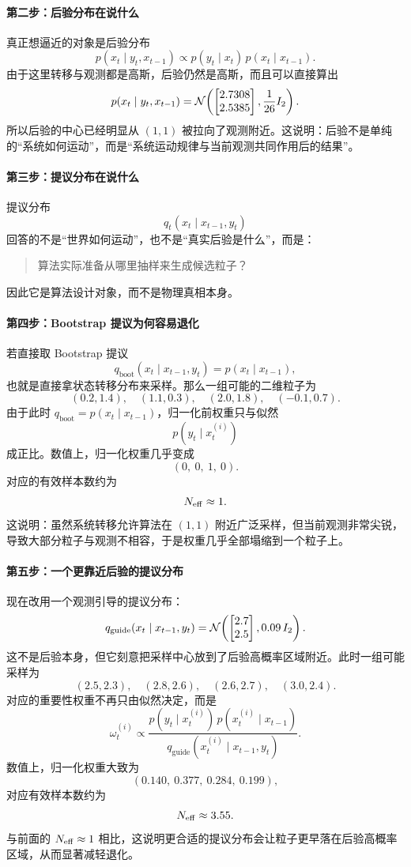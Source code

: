\documentclass[12pt,a4paper]{ctexart}
\begin{document}
\paragraph{第二步：后验分布在说什么}
真正想逼近的对象是后验分布
\[
p(x_t \mid y_t,x_{t-1})
\propto
p(y_t \mid x_t)\,p(x_t \mid x_{t-1}).
\]
由于这里转移与观测都是高斯，后验仍然是高斯，而且可以直接算出
\[
p(x_t \mid y_t,x_{t-1})
=
\mathcal{N}\!\left(
\begin{bmatrix}
2.7308\\
2.5385
\end{bmatrix},
\frac{1}{26}I_2
\right).
\]
所以后验的中心已经明显从 \((1,1)\) 被拉向了观测附近。这说明：后验不是单纯的“系统如何运动”，而是“系统运动规律与当前观测共同作用后的结果”。

\paragraph{第三步：提议分布在说什么}
提议分布
\[
q_t(x_t \mid x_{t-1},y_t)
\]
回答的不是“世界如何运动”，也不是“真实后验是什么”，而是：
\begin{quote}
算法实际准备从哪里抽样来生成候选粒子？
\end{quote}
因此它是算法设计对象，而不是物理真相本身。

\paragraph{第四步：Bootstrap 提议为何容易退化}
若直接取 Bootstrap 提议
\[
q_{\mathrm{boot}}(x_t \mid x_{t-1},y_t)
= p(x_t \mid x_{t-1}),
\]
也就是直接拿状态转移分布来采样。那么一组可能的二维粒子为
\[
(0.2,1.4),\quad (1.1,0.3),\quad (2.0,1.8),\quad (-0.1,0.7).
\]
由于此时 \(q_{\mathrm{boot}}=p(x_t\mid x_{t-1})\)，归一化前权重只与似然
\[
p(y_t \mid x_t^{(i)})
\]
成正比。数值上，归一化权重几乎变成
\[
(0,\ 0,\ 1,\ 0).
\]
对应的有效样本数约为
\[
N_{\mathrm{eff}} \approx 1.
\]
这说明：虽然系统转移允许算法在 \((1,1)\) 附近广泛采样，但当前观测非常尖锐，导致大部分粒子与观测不相容，于是权重几乎全部塌缩到一个粒子上。

\paragraph{第五步：一个更靠近后验的提议分布}
现在改用一个观测引导的提议分布：
\[
q_{\mathrm{guide}}(x_t \mid x_{t-1},y_t)
=
\mathcal{N}\!\left(
\begin{bmatrix}
2.7\\
2.5
\end{bmatrix},
0.09\,I_2
\right).
\]
这不是后验本身，但它刻意把采样中心放到了后验高概率区域附近。此时一组可能采样为
\[
(2.5,2.3),\quad (2.8,2.6),\quad (2.6,2.7),\quad (3.0,2.4).
\]
对应的重要性权重不再只由似然决定，而是
\[
\omega_t^{(i)}
\propto
\frac{p(y_t \mid x_t^{(i)})\,p(x_t^{(i)} \mid x_{t-1})}
{q_{\mathrm{guide}}(x_t^{(i)} \mid x_{t-1},y_t)}.
\]
数值上，归一化权重大致为
\[
(0.140,\ 0.377,\ 0.284,\ 0.199),
\]
对应有效样本数约为
\[
N_{\mathrm{eff}} \approx 3.55.
\]
与前面的 \(N_{\mathrm{eff}} \approx 1\) 相比，这说明更合适的提议分布会让粒子更早落在后验高概率区域，从而显著减轻退化。
\end{document}
